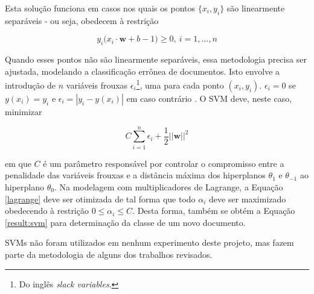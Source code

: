 Esta solução funciona em casos nos quais os pontos \ensuremath{\{x_i, y_i\}} são linearmente separáveis - ou seja, obedecem à restrição

\begin{equation}
\label{restr2:svm}
\ensuremath{y_i(x_i \cdot} \textbf{w} + \ensuremath{b -1) \geq 0,\ i = 1,...,n}
\end{equation}

Quando esses pontos não são linearmente separáveis, essa metodologia precisa ser ajustada, modelando a classificação errônea de documentos. Isto envolve a introdução de \ensuremath{n} variáveis frouxas \ensuremath{\epsilon_i}\footnote{Do inglês \emph{slack variables}.}, uma para cada ponto \ensuremath{(x_i, y_i)}. \ensuremath{\epsilon_i = 0} se \ensuremath{y(x_i) = y_i} e \ensuremath{\epsilon_i = |y_i - y(x_i)|} em caso contrário \cite{bishop}. O SVM deve, neste caso, minimizar

\begin{equation}
\label{nonlin:svm}
\ensuremath{C\sum_{i=1}^n\epsilon_i + \frac{1}{2}||}\textbf{w}\ensuremath{||^2}
\end{equation}

em que \ensuremath{C} é um parâmetro responsável por controlar o compromisso entre a penalidade das variáveis frouxas e a distância máxima dos hiperplanos \ensuremath{\theta_1} e \ensuremath{\theta_{-1}} ao hiperplano \ensuremath{\theta_0}. Na modelagem com multiplicadores de Lagrange, a Equação \ref{lagrange} deve ser otimizada de tal forma que todo \ensuremath{\alpha_i} deve ser maximizado obedecendo à restrição \ensuremath{0 \leq \alpha_i \leq C}. Desta forma, também se obtém a Equação \ref{result:svm} para determinação da classe de um novo documento.

SVMs não foram utilizados em nenhum experimento deste projeto, mas fazem parte da metodologia de alguns dos trabalhos revisados.
 



